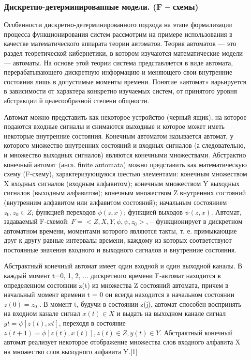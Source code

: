  \subsubsection{Дискретно-детерминированные модели. (F -- схемы)}

 Особенности дискретно-детерминированного подхода на этапе формализации процесса функционирования систем рассмотрим на примере использования в качестве математического аппарата теории автоматов. Теория автоматов — это раздел теоретической кибернетики, в котором изучаются математические модели — автоматы. На основе этой теории система представляется в виде автомата, перерабатывающего дискретную информацию и меняющего свои внутренние состояния лишь в допустимые моменты времени. Понятие «автомат» варьируется в зависимости от характера конкретно изучаемых систем, от принятого уровня абстракции й целесообразной степени общности.

 Автомат можно представить как некоторое устройство (черный ящик), на которое подаются входные сигналы и снимаются выходные и которое может иметь некоторые внутренние состояния. Конечным автоматом называется автомат, у которого множество внутренних состояний и входных сигналов (а следовательно, и множество выходных сигналов) являются конечными множествами. Абстрактно конечный автомат (англ. finite automata) можно представить как математическую схему (F-схему), характеризующуюся шестью элементами: конечным множеством X входных сигналов (входным алфавитом); конечным множеством Y выходных сигналов (выходным алфавитом); конечным множеством Z внутренних состояний (внутренним алфавитом или алфавитом состояний); начальным состоянием $z_{0}, z_{0} \in Z $; функцией переходов $\phi(z, x)$; функцией выходов $\psi(z, x)$. Автомат, задаваемый F-схемой: $F = <Z, X, Y, \phi, \psi, z_{0}>$, -- функционирует в дискретном автоматном времени, моментами которого являются такты, т. е. примыкающие друг к другу равные интервалы времени, каждому из которых соответствуют постоянные значения входного и выходного сигналов и внутренние состояния.

 Абстрактный конечный автомат имеет один входной и один выходной каналы. В каждый момент t=0, 1, 2, ... дискретного времени F-автомат находится в определенном состоянии z(t) из множества Z состояний автомата, причем в начальный момент времени t = 0 он всегда находится в начальном состоянии $z(0) = z_{0}$ . В момент t, будучи в состоянии z(j), автомат способен воспринять на входном канале сигнал $x(t) \in X$ и выдать на выходном канале сигнал $y{t} = \psi[z(t), x{t}]$, переходя в состояние $z(t+1) = \phi[z(t), x(t)], z(t) \in Z, y(t) \in Y$. Абстрактный конечный автомат реализует некоторое отображение множества слов входного алфавита X на множество слов выходного алфавита Y.[1]


